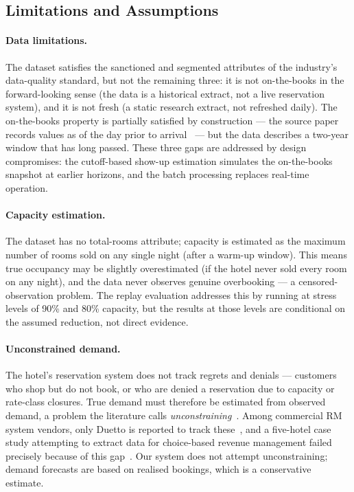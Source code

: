 \subsection{Limitations and Assumptions}

\paragraph{Data limitations.}
The dataset satisfies the sanctioned and segmented attributes of the industry's data-quality standard, but not the remaining three: it is not on-the-books in the forward-looking sense (the data is a historical extract, not a live reservation system), and it is not fresh (a static research extract, not refreshed daily). The on-the-books property is partially satisfied by construction --- the source paper records values as of the day prior to arrival~\cite{antonio2019} --- but the data describes a two-year window that has long passed. These three gaps are addressed by design compromises: the cutoff-based show-up estimation simulates the on-the-books snapshot at earlier horizons, and the batch processing replaces real-time operation.

\paragraph{Capacity estimation.}
The dataset has no total-rooms attribute; capacity is estimated as the maximum number of rooms sold on any single night (after a warm-up window). This means true occupancy may be slightly overestimated (if the hotel never sold every room on any night), and the data never observes genuine overbooking --- a censored-observation problem. The replay evaluation addresses this by running at stress levels of 90\% and 80\% capacity, but the results at those levels are conditional on the assumed reduction, not direct evidence.

\paragraph{Unconstrained demand.}
The hotel's reservation system does not track regrets and denials --- customers who shop but do not book, or who are denied a reservation due to capacity or rate-class closures. True demand must therefore be estimated from observed demand, a problem the literature calls \emph{unconstraining}~\cite{pimentel2019}. Among commercial RM system vendors, only Duetto is reported to track these~\cite{pimentel2019}, and a five-hotel case study attempting to extract data for choice-based revenue management failed precisely because of this gap~\cite{pimentel2019}. Our system does not attempt unconstraining; demand forecasts are based on realised bookings, which is a conservative estimate.

